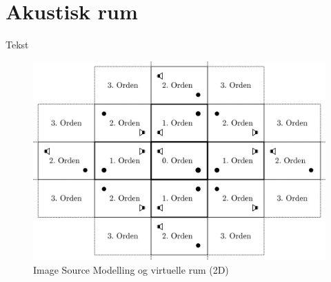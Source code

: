 \chapter{Akustisk rum}
Tekst
\begin{figure}[H]
	\centering
	\includegraphics[scale=1]{Billeder/ImageSourceModelling}
	\caption{Image Source Modelling og virtuelle rum (2D)}
\end{figure}